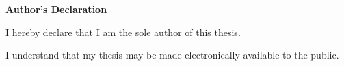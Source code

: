 \begin{center}\textbf{Author's Declaration}\end{center}

  
\noindent
I hereby declare that I am the sole author of this thesis. 

\bigskip

\noindent
I understand that my thesis may be made electronically available to the public.

\clearpage